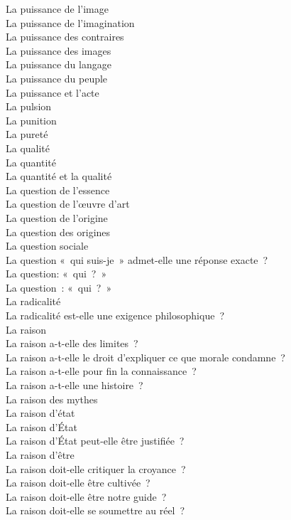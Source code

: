 \documentclass[a4paper,12pt]{article}
\begin{document}
La puissance de l'image \\
La puissance de l'imagination \\
La puissance des contraires \\
La puissance des images \\
La puissance du langage \\
La puissance du peuple \\
La puissance et l'acte \\
La pulsion \\
La punition \\
La pureté \\
La qualité \\
La quantité \\
La quantité et la qualité \\
La question de l'essence \\
La question de l'œuvre d'art \\
La question de l'origine \\
La question des origines \\
La question sociale \\
La question « qui suis-je » admet-elle une réponse exacte ? \\
La question: « qui ? » \\
La question : « qui ? » \\
La radicalité \\
La radicalité est-elle une exigence philosophique ? \\
La raison \\
La raison a-t-elle des limites ? \\
La raison a-t-elle le droit d'expliquer ce que morale condamne ? \\
La raison a-t-elle pour fin la connaissance ? \\
La raison a-t-elle une histoire ? \\
La raison des mythes \\
La raison d'état \\
La raison d'État \\
La raison d'État peut-elle être justifiée ? \\
La raison d'être \\
La raison doit-elle critiquer la croyance ? \\
La raison doit-elle être cultivée ? \\
La raison doit-elle être notre guide ? \\
La raison doit-elle se soumettre au réel ? \\
\end{document}
